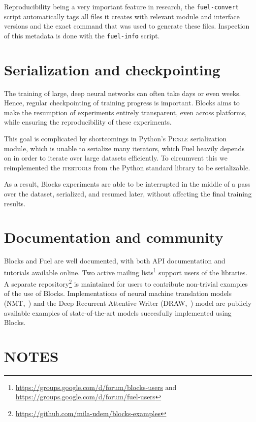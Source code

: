 \documentclass[twoside,11pt]{article}
\begin{document}
Reproducibility being a very important feature in research, the
\lstinline$fuel-convert$ script automatically tags all files it creates with
relevant module and interface versions and the exact command that was used to
generate these files. Inspection of this metadata is done with the
\lstinline$fuel-info$ script.

\section{Serialization and checkpointing}

The training of large, deep neural networks can often take days or even weeks.
Hence, regular checkpointing of training progress is important. Blocks aims to
make the resumption of experiments entirely transparent, even across platforms,
while ensuring the reproducibility of these experiments.

This goal is complicated by shortcomings in Python's \textsc{Pickle}
serialization module, which is unable to serialize many iterators, which Fuel
heavily depends on in order to iterate over large datasets efficiently. To
circumvent this we reimplemented the \textsc{itertools} from the Python
standard library to be serializable.

As a result, Blocks experiments are able to be interrupted in the middle of a
pass over the dataset, serialized, and resumed later, without affecting the
final training results.

\section{Documentation and community}

Blocks and Fuel are well documented, with both API documentation and tutorials
available online. Two active mailing
lists\footnote{\url{https://groups.google.com/d/forum/blocks-users} and
\url{https://groups.google.com/d/forum/fuel-users}} support users of the
libraries. A separate
repository\footnote{\url{https://github.com/mila-udem/blocks-examples}} is
maintained for users to contribute non-trivial examples of the use of Blocks.
Implementations of neural machine translation models
(NMT,~\cite{bahdanau2015neural}) and the Deep Recurrent Attentive Writer
(DRAW,~\cite{gregor2015draw}) model are publicly available examples of
state-of-the-art models succesfully implemented using Blocks.

\section{NOTES}
\end{document}
